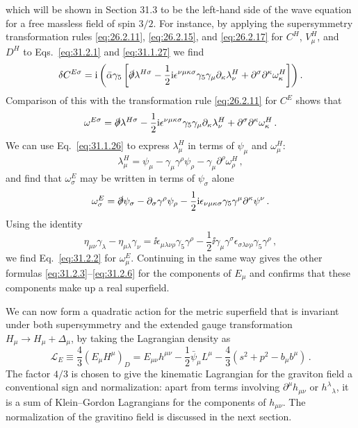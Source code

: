 which will be shown in Section 31.3 to be the left-hand side of the wave
equation for a free massless field of spin \(3/2\). For instance, by applying
the supersymmetry transformation rules \eqref{eq:26.2.11},
\eqref{eq:26.2.15}, and \eqref{eq:26.2.17} for \(C^H\), \(V_\mu^H\), and
\(D^H\) to Eqs.~\eqref{eq:31.2.1} and \eqref{eq:31.1.27} we find
\[
  \delta C^{E\sigma}
  =\mathrm{i}\left(
    \bar\alpha\gamma_5
    \left[
      \slashed{\partial}\lambda^{H\sigma}
      -\frac12\mathrm{i}\epsilon^{\nu\mu\kappa\sigma}
       \gamma_5\gamma_\mu\partial_\kappa\lambda_\nu^H
      +\partial^\sigma\partial^\kappa\omega_\kappa^H
    \right]
  \right).
\]
Comparison of this with the transformation rule \eqref{eq:26.2.11} for
\(C^E\) shows that
\[
  \omega^{E\sigma}
  =\slashed{\partial}\lambda^{H\sigma}
   -\frac12\mathrm{i}\epsilon^{\nu\mu\kappa\sigma}
    \gamma_5\gamma_\mu\partial_\kappa\lambda_\nu^H
   +\partial^\sigma\partial^\kappa\omega_\kappa^H\,.
\]
We can use Eq.~\eqref{eq:31.1.26} to express \(\lambda_\mu^H\) in terms of
\(\psi_\mu\) and \(\omega_\mu^H\):
\[
  \lambda_\mu^H
  =\psi_\mu-\gamma_\mu\gamma^\rho\psi_\rho
   -\gamma_\mu\partial^\rho\omega_\rho^H\,,
\]
and find that \(\omega_\sigma^E\) may be written in terms of \(\psi_\sigma\)
alone
\[
  \omega_\sigma^E
  =\slashed{\partial}\psi_\sigma
   -\partial_\sigma\gamma^\rho\psi_\rho
   -\frac12\mathrm{i}\epsilon_{\nu\mu\kappa\sigma}
    \gamma_5\gamma^\mu\partial^\kappa\psi^\nu\,.
\]
Using the identity
\[
  \eta_{\mu\nu}\gamma_\lambda-\eta_{\mu\lambda}\gamma_\nu
  =\ii\epsilon_{\mu\lambda\nu\rho}\gamma_5\gamma^\rho
   -\frac12\ii\gamma_\mu\gamma^\sigma
    \epsilon_{\sigma\lambda\nu\rho}\gamma_5\gamma^\rho\,,
\]
we find Eq.~\eqref{eq:31.2.2} for \(\omega_\mu^E\). Continuing in the same
way gives the other formulas \eqref{eq:31.2.3}--\eqref{eq:31.2.6} for the
components of \(E_\mu\) and confirms that these components make up a real
superfield.

We can now form a quadratic action for the metric superfield that is invariant
under both supersymmetry and the extended gauge transformation
\(H_\mu\to H_\mu+\Delta_\mu\), by taking the Lagrangian density as
\begin{equation}
  \mathcal L_E
  \equiv\frac43(E_\mu H^\mu)_D
  =E_{\mu\nu}h^{\mu\nu}
   -\frac12\bar\psi_\mu L^\mu
   -\frac43(s^2+p^2-b_\mu b^\mu)\,.
  \tag{31.2.9}\label{eq:31.2.9}
\end{equation}
The factor \(4/3\) is chosen to give the kinematic Lagrangian for the graviton
field a conventional sign and normalization: apart from terms involving
\(\partial^\mu h_{\mu\nu}\) or \(h^\lambda{}_\lambda\), it is a sum of
Klein--Gordon Lagrangians for the components of \(h_{\mu\nu}\). The
normalization of the gravitino field is discussed in the next section.

